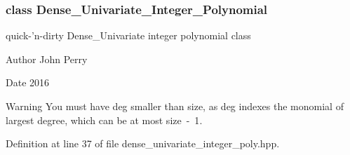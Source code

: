 \subsubsection{class Dense\+\_\+\+Univariate\+\_\+\+Integer\+\_\+\+Polynomial}
quick-\/'n-\/dirty Dense\+\_\+\+Univariate integer polynomial class 

\begin{DoxyAuthor}{Author}
John Perry 
\end{DoxyAuthor}
\begin{DoxyDate}{Date}
2016 
\end{DoxyDate}
\begin{DoxyWarning}{Warning}
You must have {\ttfamily deg} smaller than {\ttfamily size}, as {\ttfamily deg} indexes the monomial of largest degree, which can be at most {\ttfamily size~-\/~1}. 
\end{DoxyWarning}


Definition at line 37 of file dense\+\_\+univariate\+\_\+integer\+\_\+poly.\+hpp.

